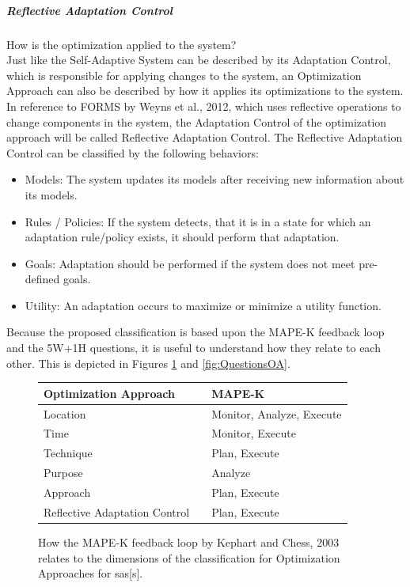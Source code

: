 \subparagraph*{Reflective Adaptation Control}
How is the optimization applied to the system? \\
Just like the Self-Adaptive System can be described by its Adaptation Control,
which is responsible for applying changes to the system,
an Optimization Approach can also be described by how it applies its optimizations to the system.
In reference to FORMS by Weyns et al., 2012\cite*{FORMS}, which uses reflective operations to change
components in the system, the Adaptation Control of the optimization approach will be called Reflective Adaptation Control.
The Reflective Adaptation Control can be classified by the following behaviors:
\begin{itemize}[nosep]
    \item Models: The system updates its models after receiving new information about its models.
    \item Rules / Policies: If the system detects, that it is in a state for which an adaptation rule/policy exists,
    it should perform that adaptation.
    \item Goals: Adaptation should be performed if the system does not meet pre-defined goals.
    \item Utility: An adaptation occurs to maximize or minimize a utility function.
\end{itemize}

\noindent Because the proposed classification is based upon the MAPE-K feedback loop and the 5W+1H questions,
it is useful to understand how they relate to each other.
This is depicted in Figures \ref{fig:MapeOA} and \ref{fig:QuestionsOA}.

\begin{figure}[h]
    \centering
    \begin{tabular}{|lcl|}
        \hline
        Optimization Approach & & MAPE-K \\
        \hline
        Location & & Monitor, Analyze, Execute \\
        \hline
        Time & & Monitor, Execute \\
        \hline
        Technique & & Plan, Execute \\
        \hline
        Purpose & & Analyze \\
        \hline
        Approach & & Plan, Execute \\
        \hline
        Reflective Adaptation Control & & Plan, Execute \\
        \hline
    \end{tabular}
    \caption{How the MAPE-K feedback loop by Kephart and Chess, 2003\cite*{VisionOfAutonomicComputing}
    relates to the dimensions of the classification for Optimization Approaches for \acrlong{sas}[s].}
    \label{fig:MapeOA}
\end{figure}


